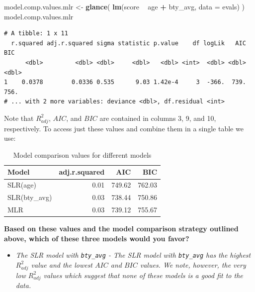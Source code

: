 \documentclass[]{article}
\newenvironment{Shaded}{\begin{snugshade}}{\end{snugshade}}
\newcommand{\KeywordTok}[1]{\textcolor[rgb]{0.13,0.29,0.53}{\textbf{#1}}}
\newcommand{\DataTypeTok}[1]{\textcolor[rgb]{0.13,0.29,0.53}{#1}}
\newcommand{\StringTok}[1]{\textcolor[rgb]{0.31,0.60,0.02}{#1}}
\newcommand{\OperatorTok}[1]{\textcolor[rgb]{0.81,0.36,0.00}{\textbf{#1}}}
\newcommand{\NormalTok}[1]{#1}
\providecommand{\tightlist}{%
  \setlength{\itemsep}{0pt}\setlength{\parskip}{0pt}}
\begin{document}
\begin{Shaded}
\begin{Highlighting}[]
\NormalTok{model.comp.values.mlr <-}\StringTok{ }\KeywordTok{glance}\NormalTok{( }\KeywordTok{lm}\NormalTok{(score }\OperatorTok{~}\StringTok{ }\NormalTok{age }\OperatorTok{+}\StringTok{ }\NormalTok{bty_avg, }\DataTypeTok{data =}\NormalTok{ evals) )}
\NormalTok{model.comp.values.mlr}
\end{Highlighting}
\end{Shaded}

\begin{verbatim}
# A tibble: 1 x 11
  r.squared adj.r.squared sigma statistic p.value    df logLik   AIC   BIC
      <dbl>         <dbl> <dbl>     <dbl>   <dbl> <int>  <dbl> <dbl> <dbl>
1    0.0378        0.0336 0.535      9.03 1.42e-4     3  -366.  739.  756.
# ... with 2 more variables: deviance <dbl>, df.residual <int>
\end{verbatim}

Note that \(R^2_{adj}\), \(AIC\), and \(BIC\) are contained in columns
3, 9, and 10, respectively. To access just these values and combine them
in a single table we use:

\begin{table}[!h]

\caption{\label{tab:unnamed-chunk-7}Model comparison values for different models}
\centering
\begin{tabular}[t]{l|r|r|r}
\hline
Model & adj.r.squared & AIC & BIC\\
\hline
SLR(age) & 0.01 & 749.62 & 762.03\\
\hline
SLR(bty\_avg) & 0.03 & 738.44 & 750.86\\
\hline
MLR & 0.03 & 739.12 & 755.67\\
\hline
\end{tabular}
\end{table}

\textbf{Based on these values and the model comparison strategy outlined
above, which of these three models would you favor?}

\begin{itemize}
\tightlist
\item
  \emph{The SLR model with \texttt{bty\_avg} - The SLR model with
  \texttt{bty\_avg} has the highest \(R^2_{adj}\) value and the lowest
  \(AIC\) and \(BIC\) values. We note, however, the very low
  \(R^2_{adj}\) values which suggest that none of these models is a good
  fit to the data.}
\end{itemize}
\end{document}
